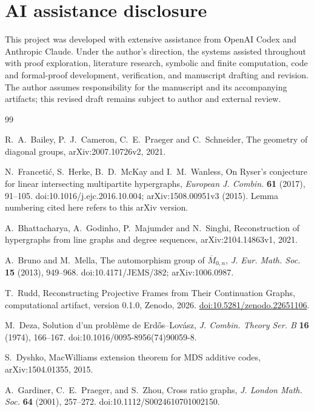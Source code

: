 \documentclass[11pt]{article}
\theoremstyle{definition}
\theoremstyle{remark}
\begin{document}
\section*{AI assistance disclosure}

This project was developed with extensive assistance from OpenAI Codex and
Anthropic Claude. Under the author's direction, the systems assisted
throughout with proof exploration, literature research, symbolic and finite
computation, code and formal-proof development, verification, and manuscript
drafting and revision. The author assumes responsibility for the manuscript and its accompanying
artifacts; this revised draft remains subject to author and external review.

\begin{thebibliography}{99}
\small

R.~A.~Bailey, P.~J.~Cameron, C.~E.~Praeger and C.~Schneider,
\newblock The geometry of diagonal groups,
\newblock arXiv:2007.10726v2, 2021.

N.~Franceti\'c, S.~Herke, B.~D.~McKay and I.~M.~Wanless,
\newblock On Ryser's conjecture for linear intersecting multipartite hypergraphs,
\newblock \emph{European J. Combin.} \textbf{61} (2017), 91--105.
\newblock doi:10.1016/j.ejc.2016.10.004; arXiv:1508.00951v3 (2015).
Lemma numbering cited here refers to this arXiv version.

A.~Bhattacharya, A.~Godinho, P.~Majumder and N.~Singhi,
\newblock Reconstruction of hypergraphs from line graphs and degree sequences,
\newblock arXiv:2104.14863v1, 2021.

A.~Bruno and M.~Mella,
\newblock The automorphism group of $\overline{M}_{0,n}$,
\newblock \emph{J. Eur. Math. Soc.} \textbf{15} (2013), 949--968.
\newblock doi:10.4171/JEMS/382; arXiv:1006.0987.

T.~Rudd,
\newblock Reconstructing Projective Frames from Their Continuation Graphs,
\newblock computational artifact, version 0.1.0, Zenodo, 2026.
\newblock \href{https://doi.org/10.5281/zenodo.22651106}{doi:10.5281/zenodo.22651106}.

M.~Deza,
\newblock Solution d'un probl\`eme de Erd\H{o}s--Lov\'asz,
\newblock \emph{J. Combin. Theory Ser. B} \textbf{16} (1974), 166--167.
\newblock doi:10.1016/0095-8956(74)90059-8.

S.~Dyshko,
\newblock MacWilliams extension theorem for MDS additive codes,
\newblock arXiv:1504.01355, 2015.

A.~Gardiner, C.~E.~Praeger, and S.~Zhou,
\newblock Cross ratio graphs,
\newblock \emph{J. London Math. Soc.} \textbf{64} (2001), 257--272.
\newblock doi:10.1112/S0024610701002150.

\end{thebibliography}
\end{document}
